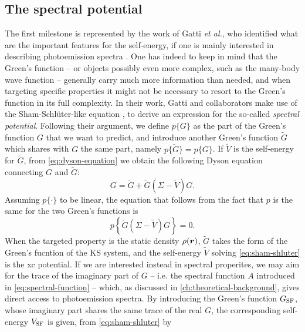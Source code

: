 \subsection{The spectral potential\label{sec:spectral-potential}}
The first milestone is represented by the work of Gatti \emph{et al.}, who identified what are the important features for the self-energy, if one is mainly interested in describing photoemission spectra \cite{gatti_transforming_2007}. One has indeed to keep in mind that the Green's function -- or objects possibly even more complex, such as the many-body wave function -- generally carry much more information than needed, and when targeting specific properties it might not be necessary to resort to the Green's function in its full complexity. In their work, Gatti and collaborators make use of the Sham-Schl\"{u}ter-like equation \cite{sham_density-functional_1983}, to derive an expression for the so-called \emph{spectral potential}. Following their argument, we define $p\{ G \}$ as the part of the Green's function $G$ that we want to predict, and introduce another Green's function $\tilde{G}$ which shares with $G$ the same part, namely $p\{ \tilde{G} \} = p\{ G \}$. If $\tilde{V}$ is the self-energy for $\tilde{G}$, from \cref{eq:dyson-equation} we obtain the following Dyson equation connecting $G$ and $\tilde{G}$:
%
\begin{equation}
    G = \tilde{G} + \tilde{G}\left( \Sigma - \tilde{V} \right) G .
    \label{eq:dyson-property-p}
\end{equation}
%
Assuming $p\{ \cdot \}$ to be linear, the equation that follows from the fact that $p$ is the same for the two Green's functions is
%
\begin{equation}
    p \left\{ \tilde{G} \left( \Sigma - \tilde{V} \right) G \right\} = 0 .
    \label{eq:sham-shluter}
\end{equation}
%
When the targeted property is the static density $\rho({\bm r})$, $\tilde{G}$ takes the form of the Green's fucntion of the KS system, and the self-energy $\tilde{V}$ solving \cref{eq:sham-shluter} is the xc potential. If we are interested instead in spectral properites, we may aim for the trace of the imaginary part of $G$ -- i.e. the spectral function $A$ introduced in \cref{eq:spectral-function} -- which, as discussed in \cref{ch:theoretical-background}, gives direct access to photoemission spectra. By introducing the Green's function $G_{\rm SF}$, whose imaginary part shares the same trace of the real $G$, the corresponding self-energy $V_{\rm SF}$ is given, from \cref{eq:sham-shluter} by
